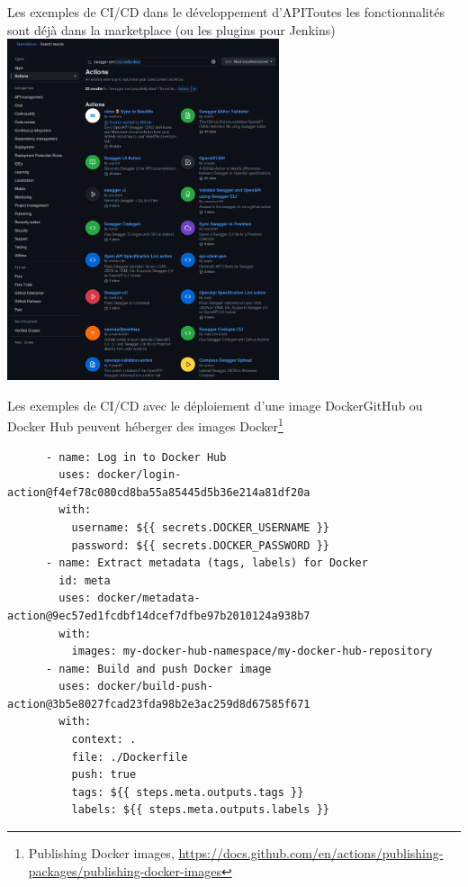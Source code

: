 \documentclass{beamer}
\begin{document}
    \begin{frame}{Les exemples de CI/CD dans le développement d'API}{Toutes les fonctionnalités sont déjà dans la marketplace (ou les plugins pour Jenkins)}
        \transdissolve
        \centering
        \includegraphics[width=8cm]{image/swagger-worflows}
    \end{frame}

    \begin{frame}[fragile]{Les exemples de CI/CD avec le déploiement d'une image Docker}{GitHub ou Docker Hub peuvent héberger des images Docker\footnote{Publishing Docker images, \url{https://docs.github.com/en/actions/publishing-packages/publishing-docker-images}}}
        \transdissolve
        \begin{lstlisting}
      - name: Log in to Docker Hub
        uses: docker/login-action@f4ef78c080cd8ba55a85445d5b36e214a81df20a
        with:
          username: ${{ secrets.DOCKER_USERNAME }}
          password: ${{ secrets.DOCKER_PASSWORD }}
      - name: Extract metadata (tags, labels) for Docker
        id: meta
        uses: docker/metadata-action@9ec57ed1fcdbf14dcef7dfbe97b2010124a938b7
        with:
          images: my-docker-hub-namespace/my-docker-hub-repository
      - name: Build and push Docker image
        uses: docker/build-push-action@3b5e8027fcad23fda98b2e3ac259d8d67585f671
        with:
          context: .
          file: ./Dockerfile
          push: true
          tags: ${{ steps.meta.outputs.tags }}
          labels: ${{ steps.meta.outputs.labels }}
        \end{lstlisting}
    \end{frame}
\end{document}

